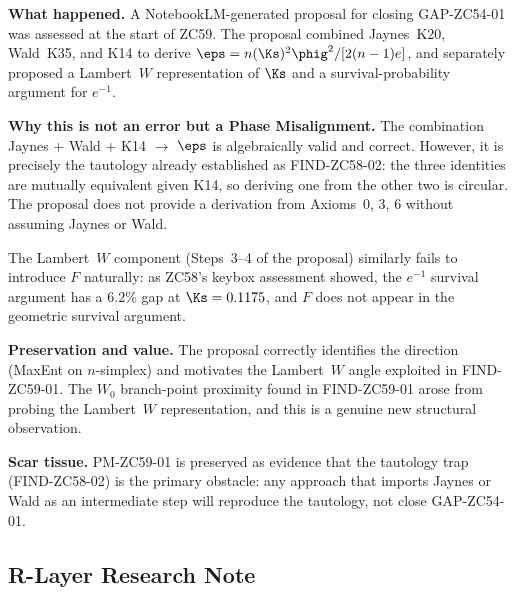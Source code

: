 \documentclass[12pt, a4paper]{article}
\begin{document}
\begin{openqbox}[title={PM-ZC59-01: NotebookLM Approach
  Reproduces FIND-ZC58-02 (Phase Misalignment)}]
\textbf{What happened.}
A NotebookLM-generated proposal for closing GAP-ZC54-01 was
assessed at the start of ZC59.  The proposal combined
Jaynes~K20, Wald~K35, and K14 to derive
$\eps = n(\Ks)^2\phig^2/[2(n-1)e]$, and separately proposed
a Lambert~$W$ representation of $\Ks$ and a survival-probability
argument for $e^{-1}$.

\textbf{Why this is not an error but a Phase Misalignment.}
The combination Jaynes + Wald + K14 $\to$ $\eps$ is algebraically
valid and correct.  However, it is precisely the tautology
already established as FIND-ZC58-02: the three identities are
mutually equivalent given K14, so deriving one from the other
two is circular.  The proposal does not provide a derivation
from Axioms~0, 3, 6 without assuming Jaynes or Wald.

The Lambert~$W$ component (Steps~3--4 of the proposal)
similarly fails to introduce $F$ naturally: as ZC58's keybox
assessment showed, the $e^{-1}$ survival argument has a $6.2\%$
gap at $\Ks = 0.1175$, and $F$ does not appear in the geometric
survival argument.

\textbf{Preservation and value.}
The proposal correctly identifies the direction (MaxEnt on
$n$-simplex) and motivates the Lambert~$W$ angle exploited in
FIND-ZC59-01.  The $W_0$ branch-point proximity found in
FIND-ZC59-01 arose from probing the Lambert~$W$ representation,
and this is a genuine new structural observation.

\textbf{Scar tissue.}
PM-ZC59-01 is preserved as evidence that the tautology
trap (FIND-ZC58-02) is the primary obstacle: any approach
that imports Jaynes or Wald as an intermediate step will
reproduce the tautology, not close GAP-ZC54-01.
\end{openqbox}

\subsection{R-Layer Research Note}
\label{sec:rlayer}
\end{document}
